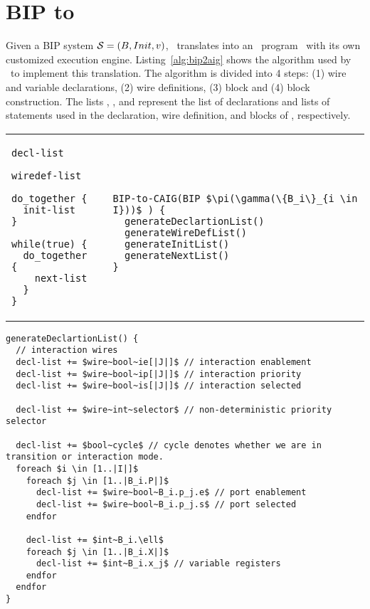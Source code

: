 
\section{BIP to \thislanguage}
\label{chap3:bip2aig:bip2etc}
Given a BIP system $\mathcal{S} = (B, Init, v)$, \biptool~translates \Pm into 
an \thislanguage~program \aigcircuit~with its own customized execution engine. 
Listing~\ref{alg:bip2aig} shows the algorithm used by \biptool~to implement 
this translation. The algorithm is divided into 4 steps: (1) wire and variable
declarations, (2) wire definitions, (3)  block and (4)  block construction. 
The lists , ,  and 
represent the list of declarations and lists of statements  used in the 
declaration, wire definition,  and  blocks of \aigcircuit, respectively. 

\begin{tabular}{p{7cm} p{1cm} p{7cm}}
\begin{lstlisting}
decl-list

wiredef-list

do_together {
  init-list
}

while(true) {
  do_together {
    next-list
  }
}
\end{lstlisting}
&
& 
\begin{lstlisting}

BIP-to-CAIG(BIP $\pi(\gamma(\{B_i\}_{i \in I}))$ ) { 
  generateDeclartionList()
  generateWireDefList()
  generateInitList()
  generateNextList()
}
\end{lstlisting}

\end{tabular}


\begin{lstlisting}
generateDeclartionList() {
  // interaction wires
  decl-list += $wire~bool~ie[|J|]$ // interaction enablement 
  decl-list += $wire~bool~ip[|J|]$ // interaction priority
  decl-list += $wire~bool~is[|J|]$ // interaction selected

  decl-list += $wire~int~selector$ // non-deterministic priority selector

  decl-list += $bool~cycle$ // cycle denotes whether we are in transition or interaction mode. 
  foreach $i \in [1..|I|]$
    foreach $j \in [1..|B_i.P|]$ 
      decl-list += $wire~bool~B_i.p_j.e$ // port enablement
      decl-list += $wire~bool~B_i.p_j.s$ // port selected
    endfor
  
    decl-list += $int~B_i.\ell$
    foreach $j \in [1..|B_i.X|]$ 
      decl-list += $int~B_i.x_j$ // variable registers
    endfor
  endfor
}
\end{lstlisting}


